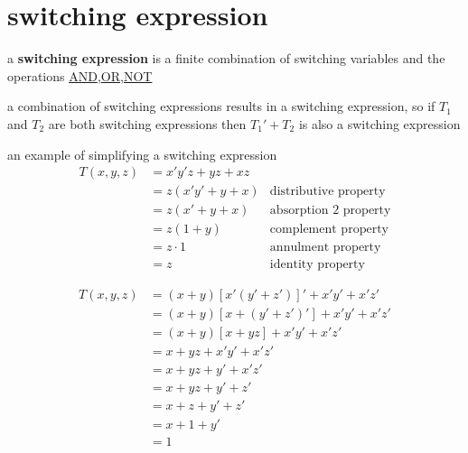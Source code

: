 \documentclass[a4paper,12pt]{article}
\begin{document}
\section{switching expression}
\label{sec:org177e6eb}
\begin{definition}
a \textbf{switching expression} is a finite combination of switching variables and the operations \hyperref[sec:org9085f40]{AND},\hyperref[sec:orga2f57d8]{OR},\hyperref[sec:orgc9ff093]{NOT}\\
\begin{characteristic}
a combination of switching expressions results in a switching expression, so if \(T_1\) and \(T_2\) are both switching expressions then \(T_1' + T_2\) is also a switching expression\\
\end{characteristic}
\begin{my_example}
an example of simplifying a switching expression\\
\begin{align*}
  T(x, y, z) &= x'y'z + yz + xz\\
             &= z(x'y' + y + x) & \text{distributive property}\\
             &= z(x' + y + x) & \text{absorption 2 property}\\
             &= z(1 + y) & \text{complement property}\\
             &= z \cdot 1 & \text{annulment property}\\
             &= z & \text{identity property}
\end{align*}
\end{my_example}
\begin{my_example}
\begin{align*}
  T(x, y, z) &= (x + y)[x'(y' + z')]' + x'y' + x'z'\\
             &= (x + y)[x + (y' + z')'] + x'y' + x'z'\\
             &= (x + y)[x + yz] + x'y' + x'z'\\
             &= x + yz + x'y' + x'z'\\
             &= x + yz + y' + x'z'\\
             &= x + yz + y' + z'\\
             &= x + z + y' + z'\\
             &= x + 1 + y'\\
             &= 1\\
\end{align*}
\end{my_example}
\end{definition}
\end{document}
